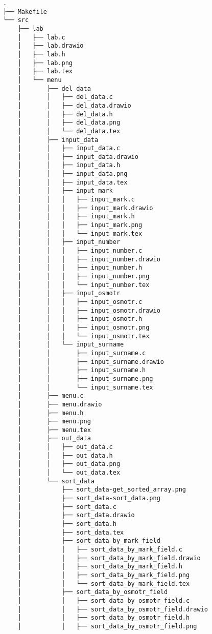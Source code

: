 \begin{verbatim}
.
├── Makefile
└── src
    ├── lab
    │   ├── lab.c
    │   ├── lab.drawio
    │   ├── lab.h
    │   ├── lab.png
    │   ├── lab.tex
    │   └── menu
    │       ├── del_data
    │       │   ├── del_data.c
    │       │   ├── del_data.drawio
    │       │   ├── del_data.h
    │       │   ├── del_data.png
    │       │   └── del_data.tex
    │       ├── input_data
    │       │   ├── input_data.c
    │       │   ├── input_data.drawio
    │       │   ├── input_data.h
    │       │   ├── input_data.png
    │       │   ├── input_data.tex
    │       │   ├── input_mark
    │       │   │   ├── input_mark.c
    │       │   │   ├── input_mark.drawio
    │       │   │   ├── input_mark.h
    │       │   │   ├── input_mark.png
    │       │   │   └── input_mark.tex
    │       │   ├── input_number
    │       │   │   ├── input_number.c
    │       │   │   ├── input_number.drawio
    │       │   │   ├── input_number.h
    │       │   │   ├── input_number.png
    │       │   │   └── input_number.tex
    │       │   ├── input_osmotr
    │       │   │   ├── input_osmotr.c
    │       │   │   ├── input_osmotr.drawio
    │       │   │   ├── input_osmotr.h
    │       │   │   ├── input_osmotr.png
    │       │   │   └── input_osmotr.tex
    │       │   └── input_surname
    │       │       ├── input_surname.c
    │       │       ├── input_surname.drawio
    │       │       ├── input_surname.h
    │       │       ├── input_surname.png
    │       │       └── input_surname.tex
    │       ├── menu.c
    │       ├── menu.drawio
    │       ├── menu.h
    │       ├── menu.png
    │       ├── menu.tex
    │       ├── out_data
    │       │   ├── out_data.c
    │       │   ├── out_data.h
    │       │   ├── out_data.png
    │       │   └── out_data.tex
    │       └── sort_data
    │           ├── sort_data-get_sorted_array.png
    │           ├── sort_data-sort_data.png
    │           ├── sort_data.c
    │           ├── sort_data.drawio
    │           ├── sort_data.h
    │           ├── sort_data.tex
    │           ├── sort_data_by_mark_field
    │           │   ├── sort_data_by_mark_field.c
    │           │   ├── sort_data_by_mark_field.drawio
    │           │   ├── sort_data_by_mark_field.h
    │           │   ├── sort_data_by_mark_field.png
    │           │   └── sort_data_by_mark_field.tex
    │           ├── sort_data_by_osmotr_field
    │           │   ├── sort_data_by_osmotr_field.c
    │           │   ├── sort_data_by_osmotr_field.drawio
    │           │   ├── sort_data_by_osmotr_field.h
    │           │   ├── sort_data_by_osmotr_field.png

\end{verbatim}
